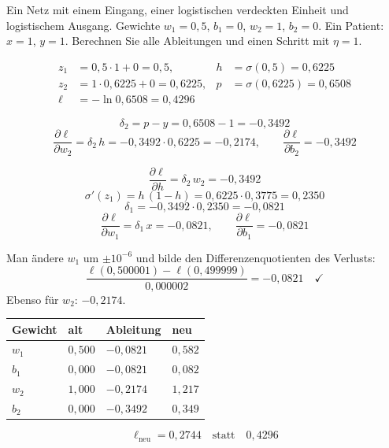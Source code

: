 \begin{aufgabe}
Ein Netz mit einem Eingang, einer logistischen verdeckten Einheit und logistischem Ausgang. Gewichte $w_1 = 0{,}5$, $b_1 = 0$, $w_2 = 1$, $b_2 = 0$. Ein Patient: $x = 1$, $y = 1$. Berechnen Sie alle Ableitungen und einen Schritt mit $\eta = 1$.

\loesung
{}
\begin{align*}
z_1 &= 0{,}5\cdot1 + 0 = 0{,}5, & h &= \sigma(0{,}5) = 0{,}6225\\
z_2 &= 1\cdot0{,}6225 + 0 = 0{,}6225, & p &= \sigma(0{,}6225) = 0{,}6508\\
\ell &= -\ln0{,}6508 = 0{,}4296
\end{align*}

\[ \delta_2 = p - y = 0{,}6508 - 1 = -0{,}3492 \]
\[ \frac{\partial\ell}{\partial w_2} = \delta_2\,h = -0{,}3492\cdot0{,}6225 = -0{,}2174, \qquad \frac{\partial\ell}{\partial b_2} = -0{,}3492 \]

\[ \frac{\partial\ell}{\partial h} = \delta_2\,w_2 = -0{,}3492 \]
\[ \sigma'(z_1) = h\,(1-h) = 0{,}6225\cdot0{,}3775 = 0{,}2350 \]
\[ \delta_1 = -0{,}3492\cdot0{,}2350 = -0{,}0821 \]
\[ \frac{\partial\ell}{\partial w_1} = \delta_1\,x = -0{,}0821, \qquad \frac{\partial\ell}{\partial b_1} = -0{,}0821 \]

Man ändere $w_1$ um $\pm10^{-6}$ und bilde den Differenzenquotienten des Verlusts:
\[ \frac{\ell(0{,}500001) - \ell(0{,}499999)}{0{,}000002} = -0{,}0821 \quad \checkmark \]
Ebenso für $w_2$: $-0{,}2174$. \checkmark

\begin{center}
{\small
\renewcommand{\arraystretch}{1.48}
\begin{tabular}{@{}P{1.6cm}P{1.6cm}P{2.2cm}P{1.8cm}@{}}
\toprule
\textbf{Gewicht} & \textbf{alt} & \textbf{Ableitung} & \textbf{neu}\\
\midrule
$w_1$ & $0{,}500$ & $-0{,}0821$ & $0{,}582$\\
$b_1$ & $0{,}000$ & $-0{,}0821$ & $0{,}082$\\
$w_2$ & $1{,}000$ & $-0{,}2174$ & $1{,}217$\\
$b_2$ & $0{,}000$ & $-0{,}3492$ & $0{,}349$\\
\bottomrule
\end{tabular}}
\end{center}

\[ \ell_{\text{neu}} = 0{,}2744 \quad\text{statt}\quad 0{,}4296 \]

\begin{center}
\begin{minipage}{0.88\textwidth}
\end{minipage}
\end{center}
\end{aufgabe}
